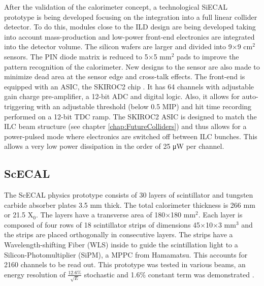 After the validation of the calorimeter concept, a technological SiECAL prototype is being developed focusing on the integration into a full linear collider detector. To do this, modules close to the ILD design are being developed taking into account mass-production and low-power front-end electronics are integrated into the detector volume. The silicon wafers are larger and divided into 9$\times$9 cm$^2$ sensors. The PIN diode matrix is reduced to 5$\times$5 mm$^2$ pads to improve the pattern recognition of the calorimeter. New designs to the sensor are also made to minimize dead area at the sensor edge and cross-talk effects. The front-end is equipped with an ASIC, the SKIROC2 chip \cite{1748-0221-6-12-C12040}. It has 64 channels with adjustable gain charge pre-amplifier, a 12-bit ADC and digital logic. Also, it allows for auto-triggering with an adjustable threshold (below 0.5 MIP) and hit time recording performed on a 12-bit TDC ramp. The SKIROC2 ASIC is designed to match the ILC beam structure (see chapter \ref{chap:FutureColliders}) and thus allows for a power-pulsed mode where electronics are switched off between ILC bunches. This allows a very low power dissipation in the order of 25 \si{\micro\watt} per channel.

\subsection{ScECAL}
\label{subsec:ScECAL}

The ScECAL physics prototype consists of 30 layers of scintillator and tungsten carbide absorber plates 3.5 mm thick. The total calorimeter thickness is 266 mm or 21.5 X$_0$. The layers have a transverse area of 180$\times$180 mm$^2$. Each layer is composed of four rows of 18 scintillator strips of dimensions 45$\times$10$\times$3 mm$^3$ and the strips are placed orthogonally in consecutive layers. The strips have a Wavelength-shifting Fiber (WLS) inside to guide the scintillation light to a Silicon-Photomultiplier (SiPM), a MPPC from Hamamatsu. This accounts for 2160 channels to be read out. This prototype was tested in various beams, an energy resolution of $\frac{12.6\%}{\sqrt{E}}$ stochastic and 1.6\% constant term was demonstrated \cite{1707.07126v2}.

